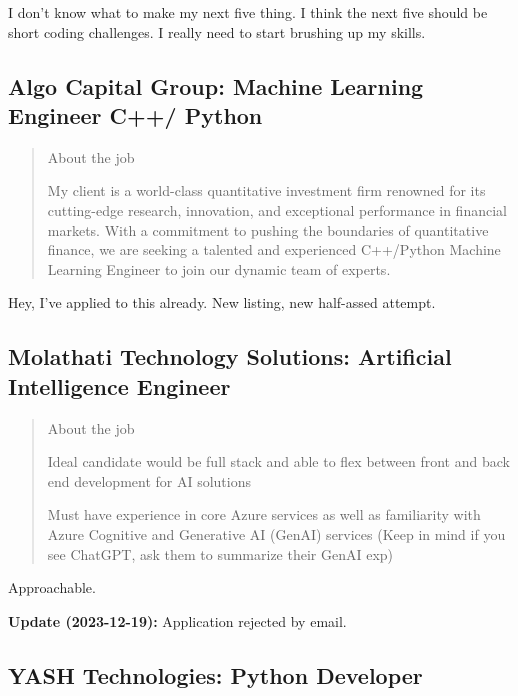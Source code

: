 \documentclass[
	letterpaper, %
	12pt, %
]{CSSullivanBusinessReport}
\begin{document}
I don't know what to make my next five thing. I think the next five should be short coding challenges. I really need to start brushing up my skills. 


\subsection[Algo Capital Group]{Algo Capital Group: Machine Learning Engineer C++/ Python}

\begin{quote}
	About the job
	
	My client is a world-class quantitative investment firm renowned for its cutting-edge research, innovation, and exceptional performance in financial markets. With a commitment to pushing the boundaries of quantitative finance, we are seeking a talented and experienced C++/Python Machine Learning Engineer to join our dynamic team of experts.

\end{quote}

Hey, I've applied to this already. New listing, new half-assed attempt.


\subsection[Molathati Technology Solutions]{Molathati Technology Solutions: Artificial Intelligence Engineer}

\begin{quote}
	About the job
	
	Ideal candidate would be full stack and able to flex between front and back end development for AI solutions

	Must have experience in core Azure services as well as familiarity with Azure Cognitive and Generative AI (GenAI) services (Keep in mind if you see ChatGPT, ask them to summarize their GenAI exp) 

\end{quote}

Approachable.

\textbf{Update (2023-12-19):} Application rejected by email.


\subsection[YASH Technologies]{YASH Technologies: Python Developer}
\end{document}

